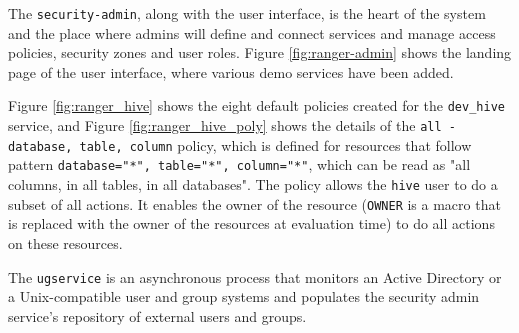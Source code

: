 The \texttt{security-admin}, along with the user interface, is the heart of the system and the place where admins will define and connect services and manage access policies, security zones and user roles. Figure \ref{fig:ranger-admin} shows the landing page of the user interface, where various demo services have been added.

Figure \ref{fig:ranger_hive} shows the eight default policies created for the \texttt{dev_hive} service, and Figure \ref{fig:ranger_hive_poly} shows the details of the \texttt{all - database, table, column} policy, which is defined for resources that follow pattern \texttt{{database="*", table="*", column="*"}}, which can be read as "all columns, in all tables, in all databases". The policy allows the \texttt{hive} user to do a subset of all actions. It enables the owner of the resource (\texttt{{OWNER}} is a macro that is replaced with the owner of the resources at evaluation time) to do all actions on these resources.

The \texttt{ugservice} is an asynchronous process that monitors an Active Directory or a Unix-compatible user and group systems and populates the security admin service's repository of external users and groups.

